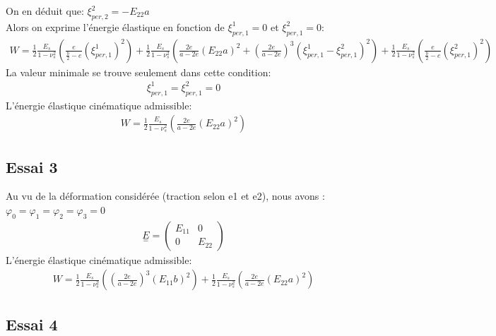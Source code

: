 \documentclass{article}
\begin{document}
On en déduit que: $\xi_{per,2}^{2}=-E_{22}a$\\
Alors on exprime l’énergie élastique en fonction de $\xi_{per,1}^{1}=0$ et $\xi_{per,1}^{2}=0$:\\
\begin{align*}
    W=\frac{1}{2}\frac{E_{s}}{1-\nu_{s}^{2}}(\frac{e}{\frac{b}{2}-e}(\xi_{per,1}^{1})^{2})+\frac{1}{2}\frac{E_{s}}{1-\nu_{s}^{2}}(\frac{2e}{a-2e}(E_{22}a)^{2}+(\frac{2e}{a-2e})^{3}(\xi_{per,1}^{1}-\xi_{per,1}^{2})^{2})+\frac{1}{2}\frac{E_{s}}{1-\nu_{s}^{2}}(\frac{e}{\frac{b}{2}-e}(\xi_{per,1}^{2})^{2})
\end{align*}
La valeur minimale se trouve seulement dans cette condition:\\
\begin{align*}
    \xi_{per,1}^{1}=\xi_{per,1}^{2}=0
\end{align*}
L'énergie élastique cinématique admissible:\\
\begin{align*}
    W=\frac{1}{2}\frac{E_{s}}{1-\nu_{s}^{2}}(\frac{2e}{a-2e}(E_{22}a)^{2})
\end{align*}

\subsection{Essai \large{\textcircled{\small{3}}}}
Au vu de la déformation considérée (traction selon e1 et e2), nous avons : $\varphi_{0}=\varphi_{1}=\varphi_{2}=\varphi_{3}=0$\\
\begin{align*}
    \underset{=}{E}=\begin{pmatrix}E_{11}&0\\0&E_{22}\end{pmatrix}
\end{align*}
L'énergie élastique cinématique admissible:\\
\begin{align*}
    W=\frac{1}{2}\frac{E_{s}}{1-\nu_{s}^{2}}((\frac{2e}{a-2e})^{3}(E_{11}b)^{2})+\frac{1}{2}\frac{E_{s}}{1-\nu_{s}^{2}}(\frac{2e}{a-2e}(E_{22}a)^{2})
\end{align*}

\subsection{Essai \large{\textcircled{\small{4}}}}
\end{document}
